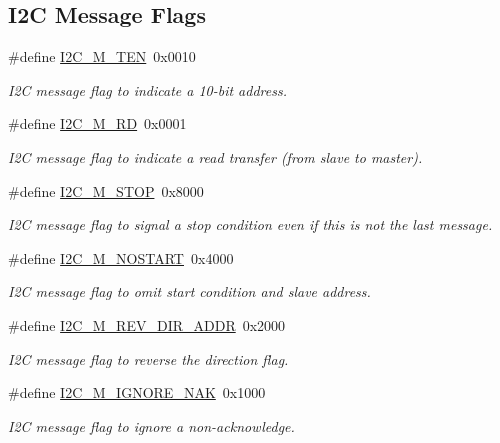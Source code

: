 \subsection*{I2C Message Flags}
\begin{DoxyCompactItemize}
\item 
\#define \mbox{\hyperlink{group__I2CLinux_gabe53ff15e0717ccbd1d4c656c09ee53a}{I2\+C\+\_\+\+M\+\_\+\+T\+EN}}~0x0010
\begin{DoxyCompactList}\small\item\em I2C message flag to indicate a 10-\/bit address. \end{DoxyCompactList}\item 
\#define \mbox{\hyperlink{group__I2CLinux_gadb8eddbb89e88c4fc0e44306fc878b85}{I2\+C\+\_\+\+M\+\_\+\+RD}}~0x0001
\begin{DoxyCompactList}\small\item\em I2C message flag to indicate a read transfer (from slave to master). \end{DoxyCompactList}\item 
\#define \mbox{\hyperlink{group__I2CLinux_gaf8026e2132312a148edbe7ff4ce52a72}{I2\+C\+\_\+\+M\+\_\+\+S\+T\+OP}}~0x8000
\begin{DoxyCompactList}\small\item\em I2C message flag to signal a stop condition even if this is not the last message. \end{DoxyCompactList}\item 
\#define \mbox{\hyperlink{group__I2CLinux_ga7a467d37a113d97496f0fa69c6c15650}{I2\+C\+\_\+\+M\+\_\+\+N\+O\+S\+T\+A\+RT}}~0x4000
\begin{DoxyCompactList}\small\item\em I2C message flag to omit start condition and slave address. \end{DoxyCompactList}\item 
\#define \mbox{\hyperlink{group__I2CLinux_ga6392dd65e4022a3ed20fc2d7dca3392f}{I2\+C\+\_\+\+M\+\_\+\+R\+E\+V\+\_\+\+D\+I\+R\+\_\+\+A\+D\+DR}}~0x2000
\begin{DoxyCompactList}\small\item\em I2C message flag to reverse the direction flag. \end{DoxyCompactList}\item 
\#define \mbox{\hyperlink{group__I2CLinux_ga0629c50bb05b4c037e726373da50755b}{I2\+C\+\_\+\+M\+\_\+\+I\+G\+N\+O\+R\+E\+\_\+\+N\+AK}}~0x1000
\begin{DoxyCompactList}\small\item\em I2C message flag to ignore a non-\/acknowledge. \end{DoxyCompactList}\item 

\end{DoxyCompactItemize}

